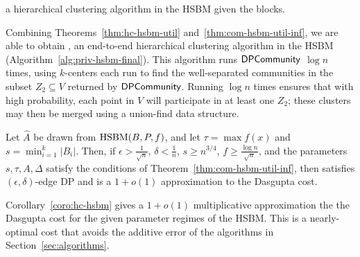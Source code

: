 \begin{algorithm}
\caption{\dphchsbm{} a hierarchical clustering algorithm in the HSBM given the blocks.}\label{alg:priv-hsbm-final}
\begin{algorithmic}
\ENDFOR
{}
\end{algorithmic}
\end{algorithm}
Combining Theorems~\ref{thm:hc-hsbm-util} and~\ref{thm:com-hsbm-util-inf}, we are able to obtain \dphchsbm{}, an end-to-end hierarchical clustering algorithm in the HSBM (Algorithm~\ref{alg:priv-hsbm-final}). This algorithm runs $\textsf{DPCommunity}{}$ $\log n$ times, using $k$-centers each run to find the well-separated communities in the subset $Z_2 \subseteq V$ returned by $\textsf{DPCommunity}{}$. Running $\log n$ times ensures that with high probability, each point in $V$ will participate in at least one $Z_2$; these clusters may then be merged using a union-find data structure.
\begin{coro}\label{coro:hc-hsbm}
    Let $\hat{A}$ be drawn from $\textnormal{HSBM}(B,P,f)$, and let $\tau = \max f(x)$ and $s = \min_{i=1}^k|B_i|$. Then, if $\epsilon > \frac{1}{\sqrt{n}}$, $\delta < \frac{1}{n}$, $s \geq n^{3/4}$, $f \geq \frac{\log n}{\sqrt{n}}$, and the parameters $s,\tau,A,\Delta$ satisfy the conditions of Theorem~\ref{thm:com-hsbm-util-inf}, then \dphchsbm{} satisfies $(\epsilon, \delta)$-edge DP and is a $1+o(1)$ approximation to the Dasgupta cost. 
\end{coro}
Corollary~\ref{coro:hc-hsbm} gives a $1+o(1)$ multiplicative approximation the the Dasgupta cost for the given parameter regimes of the HSBM. This is a nearly-optimal cost that avoids the additive error of the algorithms in Section~\ref{sec:algorithms}.